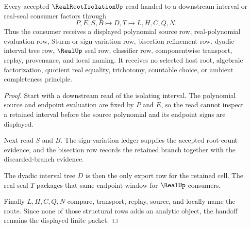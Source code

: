 \begin{theorem}
\label{thm:real-root-isolation-dyadic-interval-handoff}
Every accepted $\RealRootIsolationUp$ read handed to a downstream interval or real-seal consumer factors through
$$
P,E,S,B \longmapsto D,T \longmapsto L,H,C,Q,N .
$$
Thus the consumer receives a displayed polynomial source row, real-polynomial evaluation row, Sturm or sign-variation row, bisection refinement row, dyadic interval tree row, $\RealUp$ seal row, classifier row, componentwise transport, replay, provenance, and local naming. It receives no selected host root, algebraic factorization, quotient real equality, trichotomy, countable choice, or ambient completeness principle.
\end{theorem}
\begin{proof}
Start with a downstream read of the isolating interval. The polynomial source and endpoint evaluation are fixed by $P$ and $E$, so the read cannot inspect a retained interval before the source polynomial and its endpoint signs are displayed.

Next read $S$ and $B$. The sign-variation ledger supplies the accepted root-count evidence, and the bisection row records the retained branch together with the discarded-branch evidence.

The dyadic interval tree $D$ is then the only export row for the retained cell. The real seal $T$ packages that same endpoint window for $\RealUp$ consumers.

Finally $L,H,C,Q,N$ compare, transport, replay, source, and locally name the route. Since none of those structural rows adds an analytic object, the handoff remains the displayed finite packet.
\end{proof}



